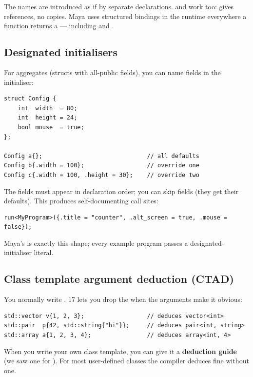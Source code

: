The names are introduced as if by separate declarations.
 and  work too:  gives references, no copies. Maya uses structured bindings in
the runtime everywhere a function returns a  ---
including  and .

\subsection{Designated initialisers}

For aggregates (structs with all-public fields), you can name fields
in the initialiser:

\begin{lstlisting}
struct Config {
    int  width  = 80;
    int  height = 24;
    bool mouse  = true;
};

Config a{};                              // all defaults
Config b{.width = 100};                  // override one
Config c{.width = 100, .height = 30};    // override two
\end{lstlisting}

The fields must appear in declaration order; you can skip fields
(they get their defaults). This produces self-documenting call sites:

\begin{lstlisting}
run<MyProgram>({.title = "counter", .alt_screen = true, .mouse = false});
\end{lstlisting}

Maya's  is exactly this shape; every example program
passes a designated-initialiser literal.

\subsection{Class template argument deduction (CTAD)}

You normally write . \cpp{}17
lets you drop the  when the arguments make it obvious:

\begin{lstlisting}
std::vector v{1, 2, 3};                  // deduces vector<int>
std::pair  p{42, std::string{"hi"}};     // deduces pair<int, string>
std::array a{1, 2, 3, 4};                // deduces array<int, 4>
\end{lstlisting}

When you write your own class template, you can give it a
\textbf{deduction guide} (we saw one for ). For most
user-defined classes the compiler deduces fine without one.

